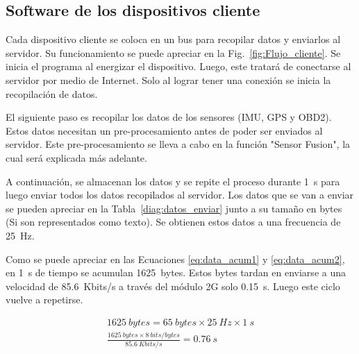 \subsection{Software de los dispositivos cliente}

Cada dispositivo cliente se coloca en un bus para recopilar datos y enviarlos al servidor. Su funcionamiento se puede apreciar en la Fig.~\ref{fig:Flujo_cliente}. Se inicia el programa al energizar el dispositivo. Luego, este tratará de conectarse al servidor por medio de Internet. Solo al lograr tener una conexión se inicia la recopilación de datos.

El siguiente paso es recopilar los datos de los sensores (IMU, GPS y OBD2). Estos datos necesitan un pre-procesamiento antes de poder ser enviados al servidor. Este pre-procesamiento se lleva a cabo en la función "Sensor Fusion", la cual será explicada más adelante.

A continuación, se almacenan los datos y se repite el proceso durante \SI{1}{s} para luego enviar todos los datos recopilados al servidor. Los datos que se van a enviar se pueden apreciar en la Tabla~\ref{diag:datos_enviar} junto a su tamaño en bytes (Si son representados como texto). Se obtienen estos datos a una frecuencia de \SI{25}{Hz}.

Como se puede apreciar en las Ecuaciones \ref{eq:data_acum1} y \ref{eq:data_acum2}, en \SI{1}{s} de tiempo se acumulan \SI{1625}{bytes}. Estos bytes tardan en enviarse a una velocidad de \SI{85.6}{Kbits/s} a través del módulo 2G solo \SI{0.15}{s}. Luego este ciclo vuelve a repetirse.


\begin{align}
\SI{1625}{bytes}=\SI{65}{bytes}\times\SI{25}{Hz}\times\SI{1}{s} \label{eq:data_acum1} \\
\frac{\SI{1625}{bytes}\times\SI{8}{bits/bytes}}{\SI{85.6}{Kbits/s}}=\SI{0.76}{s}
\label{eq:data_acum2}
\end{align}

